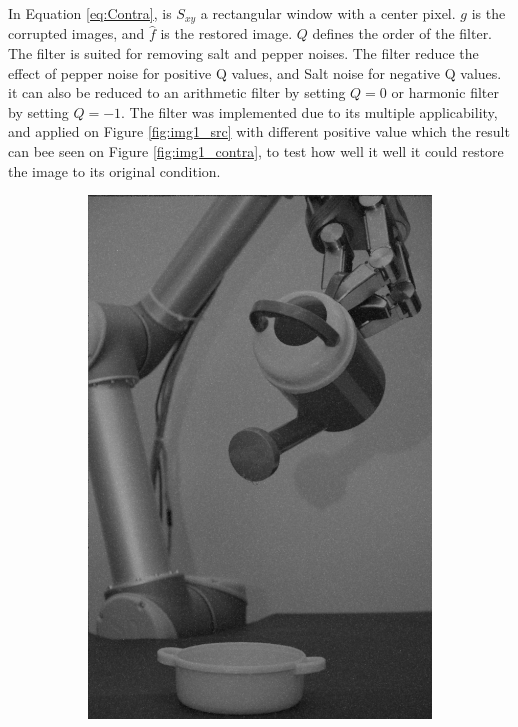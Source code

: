 In Equation \ref{eq:Contra}, is $S_{xy}$ a rectangular  window with a center pixel. $g$ is the corrupted images, and $\hat{f}$ is the restored image. $Q$ defines the order of the filter.  \\
The filter is suited for removing salt and pepper noises. The filter reduce the effect of pepper noise for positive Q values, and Salt noise for negative Q values. it can also be reduced to an arithmetic filter by setting $Q = 0$ or harmonic filter by setting $Q = -1$. The filter was implemented due to its multiple applicability, and applied on Figure \ref{fig:img1_src} with different positive value which the result can bee seen on Figure \ref{fig:img1_contra}, to test how well it well it could restore the image to its original condition.  

\begin{figure}[H]
    \centering
    \begin{subfigure}[b]{0.3\textwidth}
        \includegraphics[width=\textwidth]{img1/img_1_gaus_5_1.png}

\end{subfigure}
\end{figure}
